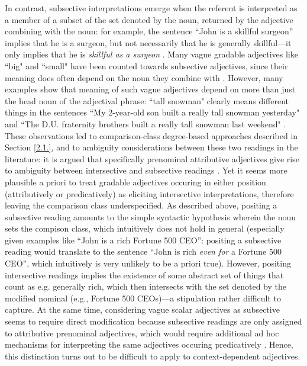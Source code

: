 In contrast, subsective interpretations emerge when the referent is interpreted as a member of a subset of the set denoted by the noun, returned by the adjective combining with the noun: for example, the sentence “John is a skillful surgeon” implies that he is a surgeon, but not necessarily that he is generally skillful---it only implies that he is \emph{skillful as a surgeon} \parencite{kennedy2012}. Many vague gradable adjectives like ``big" and ``small" have been counted towards subsective adjectives, since their meaning does often depend on the noun they combine with \parencite{sedivy1999}. However, many examples show that meaning of such vague adjectives depend on more than just the head noun of the adjectival phrase: ``tall snowman" clearly means different things in the sentences ``My 2-year-old son built a really tall snowman yesterday" and ``The D.U. fraternity brothers built a really tall snowman last weekend" \parencite[p. 115]{sedivy1999}. These observations led to comparison-class degree-based approaches described in Section \ref{2.1.}, and to ambiguity considerations between these two readings in the literature: it is argued that specifically prenominal attributive adjectives give rise to ambiguity between intersective and subsective readings \parencite[cf. ``Olga is a beautiful dancer",][]{hofherr2010adjectives}. Yet it seems more plausible a priori to treat gradable adjectives occuring in either position (attributively or predicatively) as eliciting intersective interpretations, therefore leaving the comparison class underspecified. As described above, positing a subsective reading amounts to the simple syntactic hypothesis wherein the noun sets the compison class, which intuitively does not hold in general (especially given examples like “John is a rich Fortune 500 CEO”: positing a subsective reading would translate to the sentence “John is rich \emph{even for} a Fortune 500 CEO”, which intuitively is very unlikely to be a priori true). However, positing intersective readings implies the existence of some abstract set of things that count as e.g. generally rich, which then intersects with the set denoted by the modified nominal (e.g., Fortune 500 CEOs)---a stipulation rather difficult to capture. At the same time, considering vague scalar adjectives as subsective seems to require direct modification because subsective readings are only assigned to attributive prenominal adjectives, which would require additional ad hoc mechanisms for interpreting the same adjectives occuring predicatively \parencite[cf.][]{hofherr2010adjectives}. Hence, this distinction turns out to be difficult to apply to context-dependent adjectives. 

